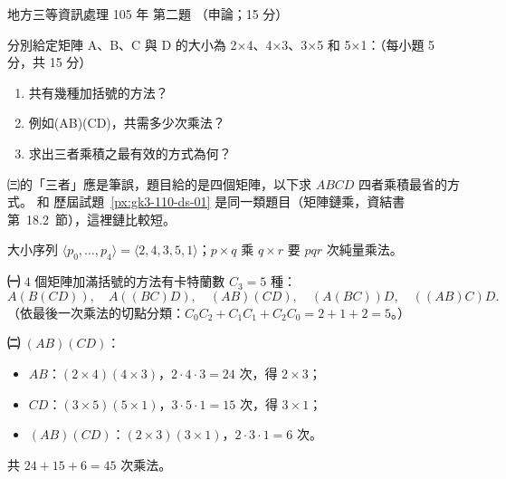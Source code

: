 \begin{pastexam}[label={px:df3-105-ds-02}]{地方三等資訊處理 105 年 第二題}
（申論；15 分）

分別給定矩陣 A、B、C 與 D 的大小為 2×4、4×3、3×5 和 5×1：（每小題 5 分，共 15 分）
\begin{enumerate}[leftmargin=2.6em, labelsep=0.4em]
\item[㈠] 共有幾種加括號的方法？
\item[㈡] 例如(AB)(CD)，共需多少次乘法？
\item[㈢] 求出三者乘積之最有效的方式為何？
\end{enumerate}
\end{pastexam}

\begin{pastsoln}
㈢的「三者」應是筆誤，題目給的是四個矩陣，以下求 $ABCD$ 四者乘積最省的方式。 和
歷屆試題~\ref{px:gk3-110-ds-01} 是同一類題目（矩陣鏈乘，資結書第~18.2~節），這裡鏈比較短。

大小序列 $\langle p_0, \ldots, p_4 \rangle = \langle 2, 4, 3, 5, 1 \rangle$；$p \times q$ 乘 $q \times r$ 要
$pqr$ 次純量乘法。

\textbf{㈠} $4$ 個矩陣加滿括號的方法有卡特蘭數 $C_3 = 5$ 種：
\[
A(B(CD)),\quad A((BC)D),\quad (AB)(CD),\quad (A(BC))D,\quad ((AB)C)D .
\]
（依最後一次乘法的切點分類：$C_0 C_2 + C_1 C_1 + C_2 C_0 = 2 + 1 + 2 = 5$。）

\textbf{㈡} $(AB)(CD)$：
\begin{itemize}
\item $AB$：$(2 \times 4)(4 \times 3)$，$2 \cdot 4 \cdot 3 = 24$ 次，得 $2 \times 3$；
\item $CD$：$(3 \times 5)(5 \times 1)$，$3 \cdot 5 \cdot 1 = 15$ 次，得 $3 \times 1$；
\item $(AB)(CD)$：$(2 \times 3)(3 \times 1)$，$2 \cdot 3 \cdot 1 = 6$ 次。
\end{itemize}
共 $24 + 15 + 6 = 45$ 次乘法。


\end{pastsoln}
